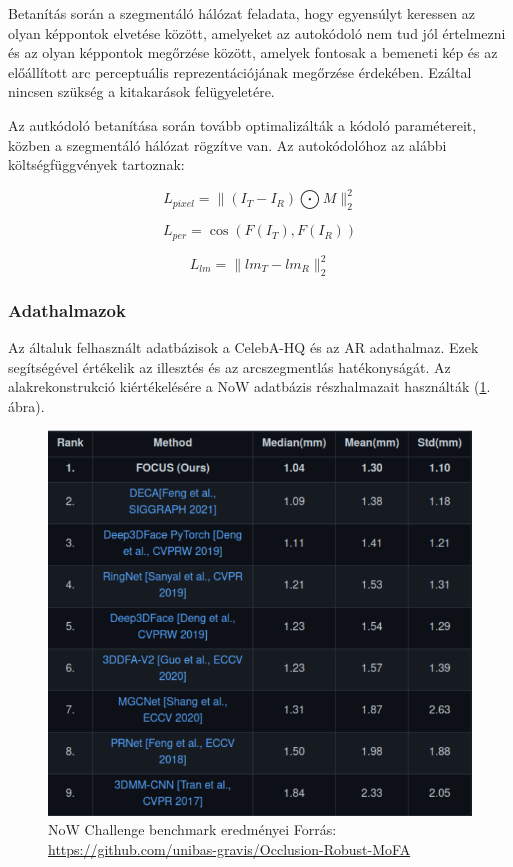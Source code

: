 \documentclass[12pt,a4]{article}
\begin{document}
         	      Betanítás során a szegmentáló hálózat feladata, hogy egyensúlyt
         	      keressen az olyan képpontok elvetése között, amelyeket az autokódoló nem
         	      tud jól értelmezni és az olyan képpontok megőrzése között, amelyek fontosak
         	      a bemeneti kép és az előállított arc perceptuális reprezentációjának 
                megőrzése érdekében. Ezáltal nincsen szükség a kitakarások felügyeletére.
         	
         	      Az autkódoló betanítása során tovább optimalizálták a kódoló paramétereit, 
                közben a szegmentáló hálózat rögzítve van. Az autokódolóhoz az alábbi költségfüggvények tartoznak:
        
                \begin{equation*}
                    L_{pixel} = \parallel (I_{T} − I_{R}) \bigodot M \parallel _{2}^{2} 
                \end{equation*}
                
                \begin{equation*}
                    L_{per} = \cos(F(I_{T}), F(I_{R}))    
                \end{equation*}
                
                \begin{equation*}
                    L_{lm} = \parallel lm_{T} - lm_{R} \parallel _{2}^{2}  
                \end{equation*}
            \subsubsection{Adathalmazok}
            
             	Az általuk felhasznált adatbázisok a CelebA-HQ és az AR adathalmaz.
             	Ezek segítségével értékelik az illesztés és az arcszegmentlás hatékonyságát.
             	Az alakrekonstrukció kiértékelésére a NoW adatbázis
             	részhalmazait használták (\ref{fig:now}. ábra).
     	
             	\begin{figure}[h!]	
             		\centering
             		\includegraphics[width=0.7\linewidth]{now}
             		\caption{NoW Challenge benchmark eredményei
             			Forrás: \url{https://github.com/unibas-gravis/Occlusion-Robust-MoFA}}
                    \label{fig:now}
             	\end{figure} 
\end{document}
